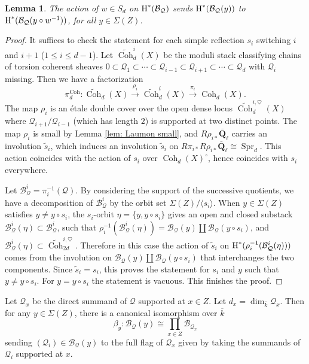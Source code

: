 \documentclass[reqno]{amsart}
\numberwithin{equation}{section}
\newcommand{\wt}[1]{\widetilde{#1}}
\newcommand{\Q}{\mathbf{Q}}
\DeclareMathOperator{\Coh}{Coh}
\DeclareMathOperator{\Spr}{Spr}
\newcommand{\Qlbar}{\overline{\Q}_\ell}
\renewcommand{\j}[1]{\langle{#1}\rangle}
\newcommand{\ov}{\overline}
\newcommand\xr{\xrightarrow}
\renewcommand\c{\circ}
\newcommand{\cohog}[2]{\textup{H}^{#1}({#2})}     %
\renewcommand\b\beta
\newcommand{\y}{\eta}
\renewcommand{\r}{\rho}
\newcommand\hs{\heartsuit}
\newcommand\cB{\mathcal{B}}
\newcommand\cQ{\mathcal{Q}}
\newtheorem{lemma}[thm]{Lemma}
\theoremstyle{remark}
\numberwithin{equation}{section}
\begin{document}
\begin{lemma}\label{l:perm Coh}
The action of $w\in S_{d}$ on $\cohog{*}{\cB_{\cQ}}$ sends $\cohog{*}{\cB_{\cQ}(y)}$ to $\cohog{*}{\cB_{\cQ}(y\c w^{-1})}$, for all $y\in \Sigma(Z)$.
\end{lemma}
\begin{proof}
It suffices to check the statement for each simple reflection $s_{i}$ switching $i$ and $i+1$ ($1\le i\le d-1$). Let $\wt\Coh^{i}_{d}(X)$ be the moduli stack classifying chains of torsion coherent sheaves $0\subset\cQ_{1}\subset\cdots\subset\cQ_{i-1}\subset\cQ_{i+1}\subset\cdots \subset\cQ_{d}$ with $\cQ_{i}$ missing. Then we have a factorization
\begin{equation*}
\pi^{\Coh}_{d}: \wt\Coh_{d}(X)\xr{\r_{i}}\wt\Coh^{i}_{d}(X)\xr{\pi_{i}}\Coh_{d}(X).
\end{equation*}
The map $\r_{i}$ is an \'etale double cover over the open dense locus  $\wt\Coh^{i,\hs}_{d}(X)$  where $\cQ_{i+1}/\cQ_{i-1}$ (which has length $2$) is supported at two distinct points. The map $\r_{i}$ is small by Lemma \ref{lem: Laumon small}, and $R\r_{i*}\Qlbar$ carries an involution $\wt s_{i}$, which induces an involution $\wt s_{i}$ on $R\pi_{i*}R\r_{i*}\Qlbar\cong \Spr_{d}$. This action coincides with the action of $s_{i}$ over $\Coh_{d}(X)^{\c}$, hence coincides with $s_{i}$ everywhere. 

Let $\cB_{\cQ}^{i}=\pi_{i}^{-1}(\cQ)$. By considering the support of the successive quotients, we have a decomposition of $\cB_{\cQ}^{i}$ by the orbit set $\Sigma(Z)/\j{s_{i}}$. When $y\in\Sigma(Z)$ satisfies $y\ne y\c s_{i}$, the $s_{i}$-orbit $\y=\{y,y\c s_{i}\}$ gives an open and closed substack $\cB^{i}_{\cQ}(\y)\subset \cB_{\cQ}^{i}$, such that $\r^{-1}_{i}(\cB^{i}_{\cQ}(\y))=\cB_{\cQ}(y)\coprod\cB_{\cQ}(y\c s_{i})$, and $\cB^{i}_{\cQ}(\y)\subset \wt\Coh^{i,\hs}_{2d}$. Therefore in this case the action of $\wt s_{i}$ on $\cohog{*}{\r^{-1}_{i}(\cB^{i}_{\cQ}(\y))}$ comes from the involution on $\cB_{\cQ}(y)\coprod\cB_{\cQ}(y\c s_{i})$ that interchanges the two components. Since $\wt s_{i}=s_{i}$, this proves the statement for $s_{i}$ and $y$ such that $y\ne y\c s_{i}$. For $y=y\c s_{i}$ the statement is vacuous. This finishes the proof. 
\end{proof}

Let $\cQ_{x}$ be the direct summand of $\cQ$ supported at $x\in Z$. Let $d_{x}=\dim_{\ov k}\cQ_{x}$. Then for any $y\in \Sigma(Z)$, there is a canonical isomorphism over $\ov k$
\begin{equation}\label{BQy}
\b_{y}: \cB_{\cQ}(y)\cong \prod_{x\in Z}\cB_{\cQ_{x}}
\end{equation}
sending $(\cQ_{i})\in \cB_{\cQ}(y)$ to the full flag of $\cQ_{x}$ given by taking the summands of $\cQ_{i}$ supported at $x$.
\end{document}
